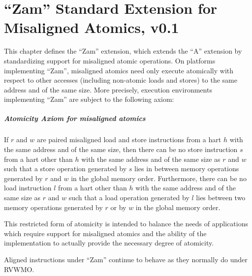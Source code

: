 \chapter{``Zam'' Standard Extension for Misaligned Atomics, v0.1}
\label{sec:zam}

This chapter defines the ``Zam'' extension, which extends the ``A'' extension by standardizing support for misaligned atomic operations.
On platforms implementing ``Zam'', misaligned atomics need only execute atomically with respect
to other accesses (including non-atomic loads and stores) to the same address and of the same size.
More precisely, execution environments implementing ``Zam'' are subject to the following axiom:

\newcommand{\misalignedatomicityaxiom}{If $r$ and $w$ are paired misaligned load and store instructions from a hart $h$ with the same address and of the same size, then there can be no store instruction $s$ from a hart other than $h$ with the same address and of the same size as $r$ and $w$ such that a store operation generated by $s$ lies in between memory operations generated by $r$ and $w$ in the global memory order.  Furthermore, there can be no load instruction $l$ from a hart other than $h$ with the same address and of the same size as $r$ and $w$ such that a load operation generated by $l$ lies between two memory operations generated by $r$ or by $w$ in the global memory order.}

\vspace{-0.2in}
\paragraph{Atomicity Axiom for misaligned atomics}
\label{rvwmo:ax:misaligned}
\misalignedatomicityaxiom

This restricted form of atomicity is intended to balance the needs of applications which require support for misaligned atomics and the ability of the implementation to actually provide the necessary degree of atomicity.

Aligned instructions under ``Zam'' continue to behave as they normally do under RVWMO.

